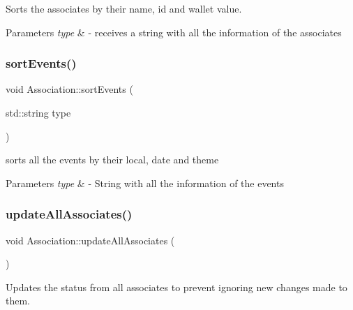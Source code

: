 Sorts the associates by their name, id and wallet value. 


\begin{DoxyParams}{Parameters}
{\em type} & -\/ receives a string with all the information of the associates \\
\hline
\end{DoxyParams}
\mbox{\label{classAssociation_a1f50c2dd311479652c3c5bb17d3770dc}} 
\subsubsection{\texorpdfstring{sort\+Events()}{sortEvents()}}
{\footnotesize\ttfamily void Association\+::sort\+Events (\begin{DoxyParamCaption}\item[{std\+::string}]{type }\end{DoxyParamCaption})}



sorts all the events by their local, date and theme 


\begin{DoxyParams}{Parameters}
{\em type} & -\/ String with all the information of the events \\
\hline
\end{DoxyParams}
\mbox{\label{classAssociation_aafcd73622038c5174a70b1c03041810d}} 
\subsubsection{\texorpdfstring{update\+All\+Associates()}{updateAllAssociates()}}
{\footnotesize\ttfamily void Association\+::update\+All\+Associates (\begin{DoxyParamCaption}{ }\end{DoxyParamCaption})}



Updates the status from all associates to prevent ignoring new changes made to them. 

\mbox{\label{classAssociation_afd8dd744fba29817387841f4b6870c2d}} 

